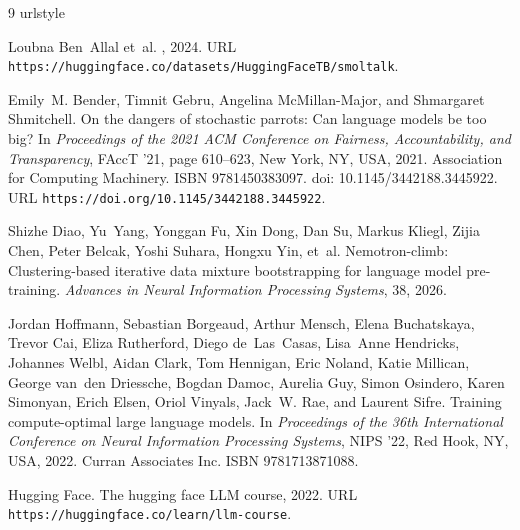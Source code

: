 \begin{thebibliography}{9}
\providecommand{\natexlab}[1]{#1}
\providecommand{\url}[1]{\texttt{#1}}
\expandafter\ifx\csname urlstyle\endcsname\relax
  \providecommand{\doi}[1]{doi: #1}\else
  \providecommand{\doi}{doi: \begingroup \urlstyle{rm}\Url}\fi

Loubna Ben~Allal et~al.
, 2024.
\newblock URL \url{https://huggingface.co/datasets/HuggingFaceTB/smoltalk}.

Emily~M. Bender, Timnit Gebru, Angelina McMillan-Major, and Shmargaret Shmitchell.
\newblock On the dangers of stochastic parrots: Can language models be too big?
\newblock In \emph{Proceedings of the 2021 ACM Conference on Fairness, Accountability, and Transparency}, FAccT '21, page 610–623, New York, NY, USA, 2021. Association for Computing Machinery.
\newblock ISBN 9781450383097.
\newblock \doi{10.1145/3442188.3445922}.
\newblock URL \url{https://doi.org/10.1145/3442188.3445922}.

Shizhe Diao, Yu~Yang, Yonggan Fu, Xin Dong, Dan Su, Markus Kliegl, Zijia Chen, Peter Belcak, Yoshi Suhara, Hongxu Yin, et~al.
\newblock Nemotron-climb: Clustering-based iterative data mixture bootstrapping for language model pre-training.
\newblock \emph{Advances in Neural Information Processing Systems}, 38, 2026.

Jordan Hoffmann, Sebastian Borgeaud, Arthur Mensch, Elena Buchatskaya, Trevor Cai, Eliza Rutherford, Diego de~Las~Casas, Lisa~Anne Hendricks, Johannes Welbl, Aidan Clark, Tom Hennigan, Eric Noland, Katie Millican, George van~den Driessche, Bogdan Damoc, Aurelia Guy, Simon Osindero, Karen Simonyan, Erich Elsen, Oriol Vinyals, Jack~W. Rae, and Laurent Sifre.
\newblock Training compute-optimal large language models.
\newblock In \emph{Proceedings of the 36th International Conference on Neural Information Processing Systems}, NIPS '22, Red Hook, NY, USA, 2022. Curran Associates Inc.
\newblock ISBN 9781713871088.

{Hugging Face}.
\newblock The hugging face {LLM} course, 2022.
\newblock URL \url{https://huggingface.co/learn/llm-course}.


\end{thebibliography}
